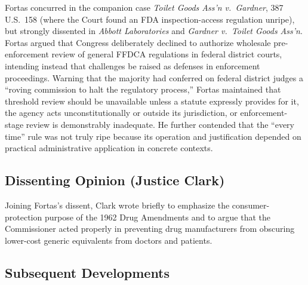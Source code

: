 \documentclass[12pt]{article}
\begin{document}
Fortas concurred in the companion case \textit{Toilet Goods Ass'n v.\ Gardner}, 387 U.S.\ 158 (where the Court found an FDA inspection-access regulation unripe), but strongly dissented in \textit{Abbott Laboratories} and \textit{Gardner v.\ Toilet Goods Ass'n}. Fortas argued that Congress deliberately declined to authorize wholesale pre-enforcement review of general FFDCA regulations in federal district courts, intending instead that challenges be raised as defenses in enforcement proceedings. Warning that the majority had conferred on federal district judges a ``roving commission to halt the regulatory process,'' Fortas maintained that threshold review should be unavailable unless a statute expressly provides for it, the agency acts unconstitutionally or outside its jurisdiction, or enforcement-stage review is demonstrably inadequate. He further contended that the ``every time'' rule was not truly ripe because its operation and justification depended on practical administrative application in concrete contexts.

\subsection{Dissenting Opinion (Justice Clark)}

Joining Fortas's dissent, Clark wrote briefly to emphasize the consumer-protection purpose of the 1962 Drug Amendments and to argue that the Commissioner acted properly in preventing drug manufacturers from obscuring lower-cost generic equivalents from doctors and patients.

\subsection{Subsequent Developments}
\end{document}

